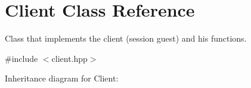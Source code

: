 \hypertarget{classClient}{}\section{Client Class Reference}
\label{classClient}


Class that implements the client (session guest) and his functions.  




{\ttfamily \#include $<$client.\+hpp$>$}



Inheritance diagram for Client\+:
